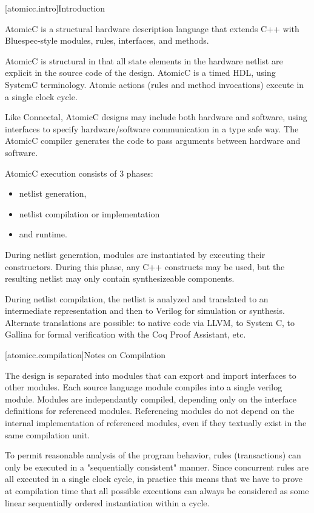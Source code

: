 [atomicc.intro]{Introduction}

AtomicC is a structural hardware description language that extends C++
with Bluespec-style modules, rules, interfaces, and methods.

AtomicC is structural in that all state elements in the hardware
netlist are explicit in the source code of the design. AtomicC is a
timed HDL, using SystemC terminology. Atomic actions (rules and method
invocations) execute in a single clock cycle.

Like Connectal, AtomicC designs may include both hardware and
software, using interfaces to specify hardware/software communication
in a type safe way. The AtomicC compiler generates the code to pass
arguments between hardware and software.

AtomicC execution consists of 3 phases:
\begin{itemize}
\item netlist generation, 
\item netlist compilation or implementation
\item and runtime.
\end{itemize}

During netlist
generation, modules are instantiated by executing their
constructors. During this phase, any C++ constructs may be used, but
the resulting netlist may only contain synthesizeable components.

During netlist compilation, the netlist is analyzed and translated to
an intermediate representation and then to Verilog for simulation or
synthesis. Alternate translations are possible: to native code via
LLVM, to System C, to Gallina for formal verification with the Coq
Proof Assistant, etc.


[atomicc.compilation]{Notes on Compilation}

The design is separated into modules that can export and import interfaces to other modules.
Each source language module compiles into a single verilog module.  Modules are independantly
compiled, depending only on the interface definitions for referenced modules.
Referencing modules do not depend on the internal implementation of referenced modules,
even if they textually exist in the same compilation unit.

To permit reasonable analysis of the program behavior, rules (transactions) can only be
executed in a "sequentially consistent" manner.  Since concurrent rules are all executed in a
single clock cycle, in practice this means that we have to prove at compilation time that
all possible executions can always be considered as some linear sequentially ordered instantiation
within a cycle.

